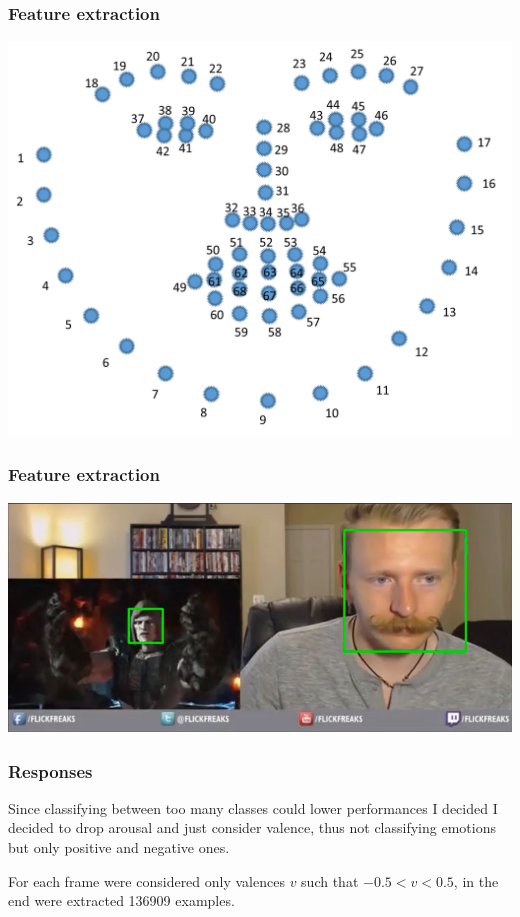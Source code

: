 \documentclass{beamer}
\begin{document}
\begin{frame}
    \frametitle{Feature extraction}
    \begin{center}
        \includegraphics[scale=0.15]{../paper/images/landmark.png}
    \end{center}
\end{frame}

\begin{frame}
    \frametitle{Feature extraction}
    \begin{center}
        \includegraphics[scale=0.3]{../paper/images/309mp4_double_face.png}
    \end{center}
\end{frame}

\begin{frame}
    \frametitle{Responses}
    Since classifying between too many classes could lower performances I decided I decided to drop arousal and just consider valence, thus not classifying emotions but only positive and negative ones.

    For each frame were considered only valences $v$ such that $ -0.5 < v < 0.5$, in the end were extracted 136909 examples. 
\end{frame}
\end{document}
